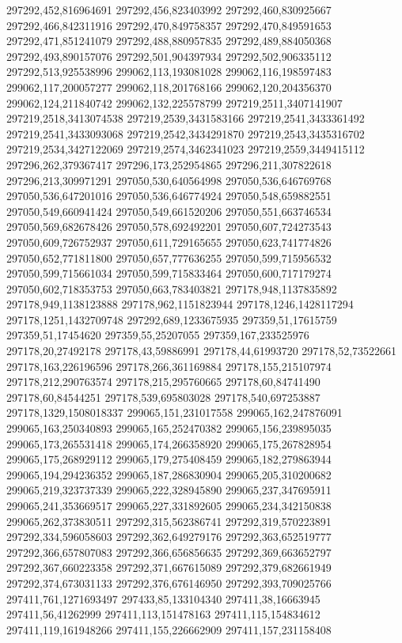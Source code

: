 297292,452,816964691
297292,456,823403992
297292,460,830925667
297292,466,842311916
297292,470,849758357
297292,470,849591653
297292,471,851241079
297292,488,880957835
297292,489,884050368
297292,493,890157076
297292,501,904397934
297292,502,906335112
297292,513,925538996
299062,113,193081028
299062,116,198597483
299062,117,200057277
299062,118,201768166
299062,120,204356370
299062,124,211840742
299062,132,225578799
297219,2511,3407141907
297219,2518,3413074538
297219,2539,3431583166
297219,2541,3433361492
297219,2541,3433093068
297219,2542,3434291870
297219,2543,3435316702
297219,2534,3427122069
297219,2574,3462341023
297219,2559,3449415112
297296,262,379367417
297296,173,252954865
297296,211,307822618
297296,213,309971291
297050,530,640564998
297050,536,646769768
297050,536,647201016
297050,536,646774924
297050,548,659882551
297050,549,660941424
297050,549,661520206
297050,551,663746534
297050,569,682678426
297050,578,692492201
297050,607,724273543
297050,609,726752937
297050,611,729165655
297050,623,741774826
297050,652,771811800
297050,657,777636255
297050,599,715956532
297050,599,715661034
297050,599,715833464
297050,600,717179274
297050,602,718353753
297050,663,783403821
297178,948,1137835892
297178,949,1138123888
297178,962,1151823944
297178,1246,1428117294
297178,1251,1432709748
297292,689,1233675935
297359,51,17615759
297359,51,17454620
297359,55,25207055
297359,167,233525976
297178,20,27492178
297178,43,59886991
297178,44,61993720
297178,52,73522661
297178,163,226196596
297178,266,361169884
297178,155,215107974
297178,212,290763574
297178,215,295760665
297178,60,84741490
297178,60,84544251
297178,539,695803028
297178,540,697253887
297178,1329,1508018337
299065,151,231017558
299065,162,247876091
299065,163,250340893
299065,165,252470382
299065,156,239895035
299065,173,265531418
299065,174,266358920
299065,175,267828954
299065,175,268929112
299065,179,275408459
299065,182,279863944
299065,194,294236352
299065,187,286830904
299065,205,310200682
299065,219,323737339
299065,222,328945890
299065,237,347695911
299065,241,353669517
299065,227,331892605
299065,234,342150838
299065,262,373830511
297292,315,562386741
297292,319,570223891
297292,334,596058603
297292,362,649279176
297292,363,652519777
297292,366,657807083
297292,366,656856635
297292,369,663652797
297292,367,660223358
297292,371,667615089
297292,379,682661949
297292,374,673031133
297292,376,676146950
297292,393,709025766
297411,761,1271693497
297433,85,133104340
297411,38,16663945
297411,56,41262999
297411,113,151478163
297411,115,154834612
297411,119,161948266
297411,155,226662909
297411,157,231158408
